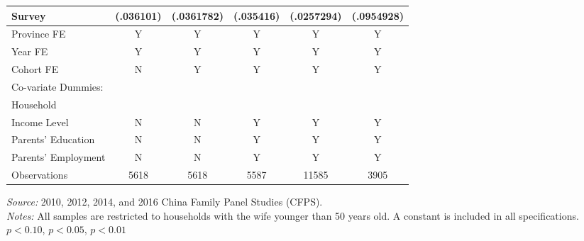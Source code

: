 \documentclass[12pt]{extarticle}
\begin{document}
\begin{table}[h]
\begin{threeparttable}
\begin{tabular}{l*{5}{c}}
\quad 2016 Survey         &   (.036101)   &  (.0361782)   &   (.035416)   &  (.0257294)   &  (.0954928)   \\
\hline
Province FE &  Y &  Y & Y & Y & Y \\
Year FE &  Y &  Y & Y & Y & Y \\
Cohort FE & N & Y & Y & Y & Y \\
Co-variate Dummies: \\
\quad Household \\
\qquad Income Level & N & N & Y & Y & Y \\
\quad Parents' Education &  N &  N & Y & Y & Y \\
\quad Parents' Employment &  N &  N & Y & Y & Y \\
\hline
Observations        &        5618   &        5618   &        5587   &       11585   &        3905   \\
\hline\hline
\end{tabular}
\begin{tablenotes}
\footnotesize \textit{Source:} 2010, 2012, 2014, and 2016 China Family Panel Studies (CFPS). \\
\textit{Notes:} All samples are restricted to households with the wife younger than 50 years old. A constant is included in all specifications. \\
\quad \sym{*} \(p<0.10\), \sym{**} \(p<0.05\), \sym{***} \(p<0.01\)
\end{tablenotes}
\end{threeparttable}
\end{table}
\end{document}

